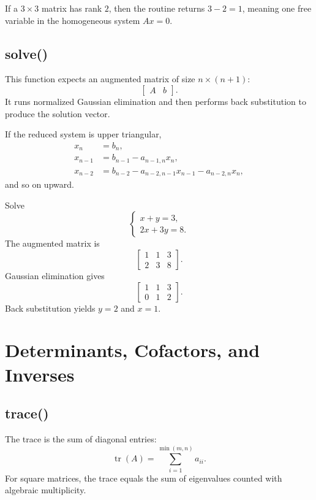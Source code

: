 \documentclass[11pt,a4paper,openany]{book}
\def\code#1{#1}%
\DeclareRobustCommand{\code}[1]{\texttt{\detokenize{#1}}}
\DeclareMathOperator{\tr}{tr}
\begin{document}
\begin{examplebox}[Example]
If a \(3 \times 3\) matrix has rank \(2\), then the routine returns \(3-2=1\), meaning one free variable in the homogeneous system \(Ax=0\).
\end{examplebox}

\section{\code{solve()}}
This function expects an augmented matrix of size \(n \times (n+1)\):
\[
\left[\begin{array}{c|c}
A & b
\end{array}\right].
\]
It runs normalized Gaussian elimination and then performs back substitution to produce the solution vector.

\begin{mathbox}
If the reduced system is upper triangular,
\[
\begin{aligned}
x_n &= b_n, \\
x_{n-1} &= b_{n-1} - a_{n-1,n}x_n, \\
x_{n-2} &= b_{n-2} - a_{n-2,n-1}x_{n-1} - a_{n-2,n}x_n,
\end{aligned}
\]
and so on upward.
\end{mathbox}

\begin{examplebox}[Example]
Solve
\[
\begin{cases}
x + y = 3, \\
2x + 3y = 8.
\end{cases}
\]
The augmented matrix is
\[
\left[
\begin{array}{cc|c}
1 & 1 & 3 \\
2 & 3 & 8
\end{array}
\right].
\]
Gaussian elimination gives
\[
\left[
\begin{array}{cc|c}
1 & 1 & 3 \\
0 & 1 & 2
\end{array}
\right].
\]
Back substitution yields \(y=2\) and \(x=1\).
\end{examplebox}

\chapter{Determinants, Cofactors, and Inverses}

\section{\code{trace()}}
The trace is the sum of diagonal entries:
\[
\tr(A) = \sum_{i=1}^{\min(m,n)} a_{ii}.
\]
For square matrices, the trace equals the sum of eigenvalues counted with algebraic multiplicity.
\end{document}
